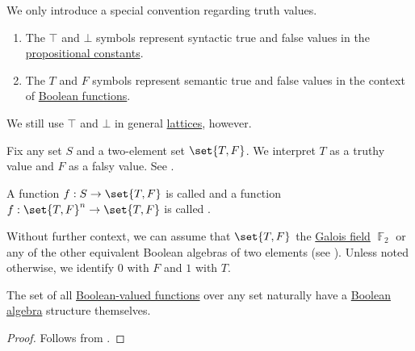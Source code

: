 \begin{remark}
  We only introduce a special convention regarding truth values.
  \begin{enumerate}
    \item The \( \top \) and \( \bot \) symbols represent syntactic true and false values in the \hyperref[def:propositional_language/constants]{propositional constants}.
    \item The \( T \) and \( F \) symbols represent semantic true and false values in the context of \hyperref[def:boolean_function]{Boolean functions}.
  \end{enumerate}

  We still use \( \top \) and \( \bot \) in general \hyperref[def:lattice]{lattices}, however.
\end{remark}

\begin{definition}\label{def:boolean_function}
  Fix any set \( S \) and a two-element set \( \set{ T, F } \). We interpret \( T \) as a truthy value and \( F \) as a falsy value. See .

  A function \( f: S \to \set{ T, F } \) is called  and a function \( f: \set{ T, F }^n \to \set{ T, F } \) is called .

  Without further context, we can assume that \( \set{ T, F } \) the \hyperref[thm:galois_field_existence]{Galois field} \( \BbbF_2 \) or any of the other equivalent Boolean algebras of two elements (see ). Unless noted otherwise, we identify \( 0 \) with \( F \) and \( 1 \) with \( T \).
\end{definition}

\begin{proposition}\label{thm:boolean_functions_form_boolean_algebra}
  The set of all \hyperref[def:boolean_function]{Boolean-valued functions} over any set naturally have a \hyperref[def:boolean_algebra]{Boolean algebra} structure themselves.
\end{proposition}
\begin{proof}
  Follows from .
\end{proof}

